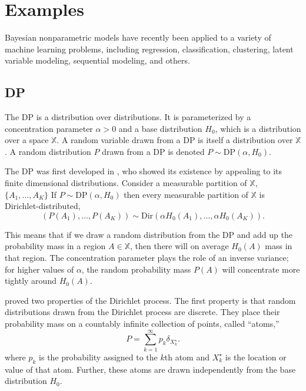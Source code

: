 
\section{Examples}
Bayesian nonparametric models have recently been applied to a variety of machine learning problems, including regression, classification, clustering, latent variable modeling, sequential modeling, and others.


\subsection{\acrlong{DP}} \label{DP}

The \acrfull{DP} is a distribution over distributions. It is parameterized by a concentration parameter $\alpha > 0$ and a base distribution $H_0$, which is a distribution over a space $\mathbb{X}$. A random variable drawn from a \gls{DP} is itself a distribution over $\mathbb{X}$. A random distribution $P$ drawn from a \gls{DP} is denoted $P \sim \text{DP}(\alpha, H_0)$.

The \gls{DP} was first developed in \cite{ferguson73}, who showed its existence by appealing to its finite dimensional distributions. Consider a measurable partition of $\mathbb{X}$, $\{A_1,\dots,A_K\}$ If $P \sim \text{DP}(\alpha, H_0)$ then every measurable partition of $\mathbb{X}$ is Dirichlet-distributed,
$$(P(A_1), \dots , P(A_K)) \sim \text{Dir}(\alpha H_0(A_1), \dots , \alpha H_0(A_K)).$$

This means that if we draw a random distribution from the \gls{DP} and add up the probability mass in a region $A \in \mathbb{X}$, then there will on average $H_0(A)$ mass in that region. The concentration parameter plays the role of an inverse variance; for higher values of $\alpha$, the random probability mass $P(A)$ will concentrate more tightly around $H_0(A)$.

\cite{ferguson73} proved two properties of the Dirichlet process. The first property is that random distributions drawn from the Dirichlet process are discrete. They place their probability mass on a countably infinite collection of points, called “atoms,”
\begin{equation} \label{eq:DP}
P = \sum_{k=1}^\infty{p_k \delta_{X_k^\star}}.
\end{equation}
where $p_k$ is the probability assigned to the $k$th atom and $X_k^\star$ is the location or value of that atom. Further, these atoms are drawn independently from the base distribution $H_0$.

